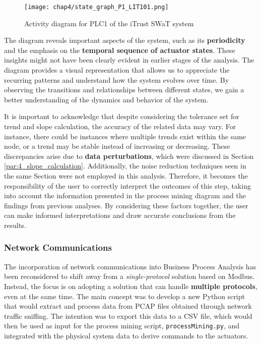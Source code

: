 \begin{figure}[ht]
	\centering
	\texttt{[image: chap4/state\_graph\_P1\_LIT101.png]}
	\caption{Activity diagram for PLC1 of the iTrust SWaT system}
	\label{fig:4_process_mining_graph}
\end{figure}

\noindent The diagram reveals important aspects of the system, such as its \textbf{periodicity} and the emphasis on the \textbf{temporal sequence of actuator states}. These insights might not have been clearly evident in earlier stages of the analysis. The diagram provides a visual representation that allows us to appreciate the recurring patterns and understand how the system evolves over time. By observing the transitions and relationships between different states, we gain a better understanding of the dynamics and behavior of the system.

\bigskip
It is important to acknowledge that despite considering the tolerance set for trend and slope calculation, the accuracy of the related data may vary. For instance, there could be instances where multiple trends exist within the same node, or a trend may be stable instead of increasing or decreasing. These discrepancies arise due to \textbf{data perturbations}, which were discussed in Section \ref{par:4_slope_calculation}. Additionally, the noise reduction techniques seen in the same Section were not employed in this analysis. Therefore, it becomes the responsibility of the user to correctly interpret the outcomes of this step, taking into account the information presented in the process mining diagram and the findings from previous analyses. By considering these factors together, the user can make informed interpretations and draw accurate conclusions from the results.

\subsubsection{Network Communications}
\label{subsub:4_proc_mining_net}
The incorporation of network communications into Business Process Analysis has been reconsidered to shift away from a \textit{single-protocol} solution based on Modbus. Instead, the focus is on adopting a solution that can handle \textbf{multiple protocols}, even at the same time.\newline
The main concept was to develop a new Python script that would extract and process data from PCAP files obtained through network traffic sniffing. The intention was to export this data to a CSV file, which would then be used as input for the process mining script, \texttt{processMining.py}, and integrated with the physical system data to derive commands to the actuators.

